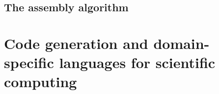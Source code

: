 \documentclass[thesis]{subfiles}
\begin{document}

\subsection{The assembly algorithm}




\section{Code generation and domain-specific languages for scientific computing}

\end{document}
